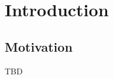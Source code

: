 
\chapter{Introduction} 
\label{chap:Introduction}

\section{Motivation}
\label{sec:Intro_Motivation}

TBD
